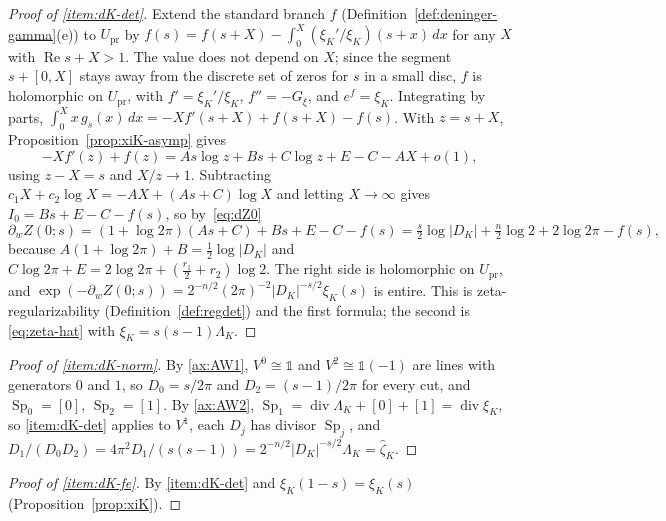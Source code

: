 \documentclass[11pt]{amsart}
\theoremstyle{plain}
\theoremstyle{definition}
\theoremstyle{remark}
\numberwithin{equation}{section}
\DeclareMathOperator{\divisor}{div}
\DeclareMathOperator{\Rea}{Re}
\renewcommand{\Re}{\Rea}
\begin{document}
\begin{proof}[Proof of \ref{item:dK-det}]
Extend the standard branch $f$
(Definition~\ref{def:deninger-gamma}(e)) to
$U_{\mathrm{pr}}$ by $f(s)=f(s+X)-\int_0^X(\xi_K'/\xi_K)(s+x)\,dx$ for
any $X$ with $\Re s+X>1$. The value does not depend on $X$; since the
segment $s+[0,X]$ stays away from the discrete set of zeros for $s$ in a
small disc, $f$ is holomorphic on $U_{\mathrm{pr}}$, with
$f'=\xi_K'/\xi_K$, $f''=-G_\xi$, and $e^f=\xi_K$. Integrating by parts,
$\int_0^Xx\,g_s(x)\,dx=-Xf'(s+X)+f(s+X)-f(s)$. With $z=s+X$,
Proposition~\ref{prop:xiK-asymp} gives
\[
-Xf'(z)+f(z)=As\log z+Bs+C\log z+E-C-AX+o(1),
\]
using $z-X=s$ and $X/z\to1$. Subtracting $c_1X+c_2\log X=-AX+(As+C)\log X$
and letting $X\to\infty$ gives $I_0=Bs+E-C-f(s)$, so by~\eqref{eq:dZ0}
\[
\partial_wZ(0;s)=(1+\log2\pi)(As+C)+Bs+E-C-f(s)
=\tfrac s2\log|D_K|+\tfrac n2\log2+2\log2\pi-f(s),
\]
because $A(1+\log2\pi)+B=\tfrac12\log|D_K|$ and $C\log2\pi+E=
2\log2\pi+(\tfrac{r_1}2+r_2)\log2$. The right side is holomorphic on
$U_{\mathrm{pr}}$, and $\exp(-\partial_wZ(0;s))=2^{-n/2}(2\pi)^{-2}
|D_K|^{-s/2}\xi_K(s)$ is entire. This is zeta-regularizability
(Definition~\ref{def:regdet}) and the first formula; the second is
\eqref{eq:zeta-hat} with $\xi_K=s(s-1)\Lambda_K$.
\end{proof}

\begin{proof}[Proof of \ref{item:dK-norm}]
By \ref{ax:AW1}, $V^0\cong\mathbb 1$ and $V^2\cong\mathbb 1(-1)$ are
lines with generators $0$ and $1$, so $D_0=s/2\pi$ and $D_2=(s-1)/2\pi$
for every cut, and $\operatorname{Sp}_0=[0]$, $\operatorname{Sp}_2=[1]$.
By \ref{ax:AW2}, $\operatorname{Sp}_1=\divisor\Lambda_K+[0]+[1]=
\divisor\xi_K$, so \ref{item:dK-det} applies to $V^1$, each $D_j$ has
divisor $\operatorname{Sp}_j$, and
$D_1/(D_0D_2)=4\pi^2D_1/(s(s-1))=2^{-n/2}|D_K|^{-s/2}\Lambda_K
=\widehat\zeta_K$.
\end{proof}

\begin{proof}[Proof of \ref{item:dK-fe}]
By \ref{item:dK-det} and $\xi_K(1-s)=\xi_K(s)$
(Proposition~\ref{prop:xiK}).
\end{proof}
\end{document}
